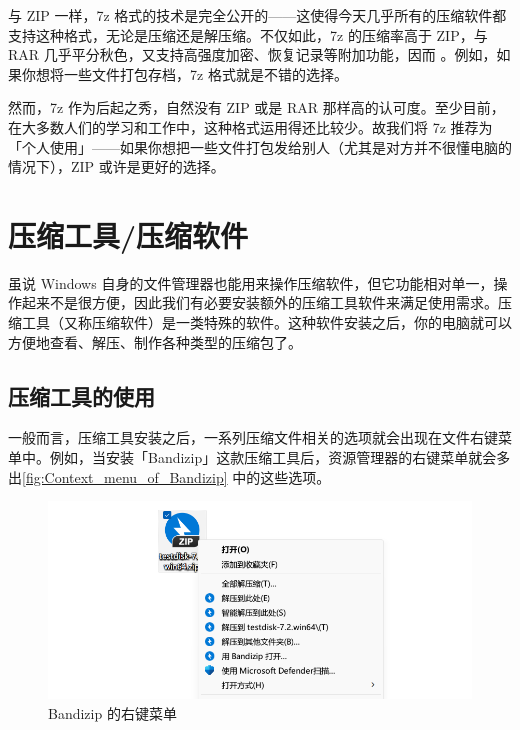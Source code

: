 与 ZIP 一样，7z 格式的技术是完全公开的——这使得今天几乎所有的压缩软件都支持这种格式，无论是压缩还是解压缩。不仅如此，7z 的压缩率高于 ZIP，与 RAR 几乎平分秋色，又支持高强度加密、恢复记录等附加功能，因而 。例如，如果你想将一些文件打包存档，7z 格式就是不错的选择。

然而，7z 作为后起之秀，自然没有 ZIP 或是 RAR 那样高的认可度。至少目前，在大多数人们的学习和工作中，这种格式运用得还比较少。故我们将 7z 推荐为「个人使用」——如果你想把一些文件打包发给别人（尤其是对方并不很懂电脑的情况下），ZIP 或许是更好的选择。

\section{压缩工具/压缩软件}

虽说 Windows 自身的文件管理器也能用来操作压缩软件，但它功能相对单一，操作起来不是很方便，因此我们有必要安装额外的压缩工具软件来满足使用需求。压缩工具（又称压缩软件）是一类特殊的软件。这种软件安装之后，你的电脑就可以方便地查看、解压、制作各种类型的压缩包了。

\subsection{压缩工具的使用}

一般而言，压缩工具安装之后，一系列压缩文件相关的选项就会出现在文件右键菜单中。例如，当安装「Bandizip」这款压缩工具后，资源管理器的右键菜单就会多出\autoref{fig:Context_menu_of_Bandizip} 中的这些选项。

\begin{figure}[htb!]
  \centering
  \includegraphics[width=.7\textwidth]{assets/software/Context_menu_of_Bandizip.png}
  \caption{Bandizip 的右键菜单}
  \label{fig:Context_menu_of_Bandizip}
\end{figure}

